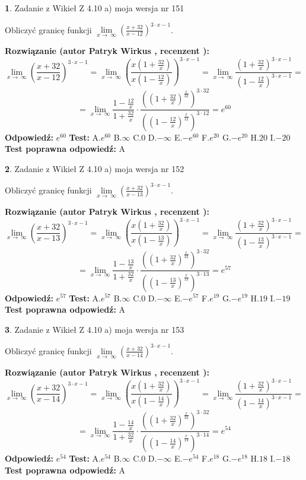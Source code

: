 \documentclass[12pt, a4paper]{article}
\theoremstyle{definition} %
\newtheorem{zad}{}
\newcommand{\zadStart}[1]{\begin{zad}#1\newline}
\newcommand{\zadStop}{\end{zad}}
\newcommand{\rozwStart}[2]{\noindent \textbf{Rozwiązanie (autor #1 , recenzent #2): }\newline}
\newcommand{\rozwStop}{\newline}
\newcommand{\odpStart}{\noindent \textbf{Odpowiedź:}\newline}
\newcommand{\odpStop}{\newline}
\newcommand{\testStart}{\noindent \textbf{Test:}\newline}
\newcommand{\testStop}{\newline}
\newcommand{\kluczStart}{\noindent \textbf{Test poprawna odpowiedź:}\newline}
\newcommand{\kluczStop}{\newline}
\begin{document}
\zadStart{Zadanie z Wikieł Z 4.10 a) moja wersja nr 151}

Obliczyć granicę funkcji  $\lim\limits_{x\to\ \infty}(\frac{x+32}{x-12})^{3\cdot x-1}$.
\zadStop
\rozwStart{Patryk Wirkus}{}
$$\lim\limits_{x\to\ \infty}(\frac{x+32}{x-12})^{3\cdot x-1} = \lim\limits_{x\to\ \infty}(\frac{x(1+\frac{32}{x})}{x(1-\frac{12}{x})})^{3\cdot x-1}=\lim\limits_{x\to\ \infty}\frac{(1+\frac{32}{x})^{3\cdot x-1}}{(1-\frac{12}{x})^{3\cdot x-1}}=$$
$$=\lim\limits_{x\to\ \infty}\frac{1-\frac{12}{x}}{1+\frac{32}{x}}\cdot\frac{((1+\frac{32}{x})^{\frac{x}{32}})^{3\cdot32}}{((1-\frac{12}{x})^{\frac{x}{12}})^{3\cdot12}}=e^{60}$$
\rozwStop
\odpStart
$e^{60}$
\odpStop
\testStart
A.$e^{60}$ B.$\infty$ C.$0$ D.$-\infty$ E.$-e^{60}$
F.$e^{20}$ G.$-e^{20}$
H.$20$
I.$-20$
\testStop
\kluczStart
A
\kluczStop



\zadStart{Zadanie z Wikieł Z 4.10 a) moja wersja nr 152}

Obliczyć granicę funkcji  $\lim\limits_{x\to\ \infty}(\frac{x+32}{x-13})^{3\cdot x-1}$.
\zadStop
\rozwStart{Patryk Wirkus}{}
$$\lim\limits_{x\to\ \infty}(\frac{x+32}{x-13})^{3\cdot x-1} = \lim\limits_{x\to\ \infty}(\frac{x(1+\frac{32}{x})}{x(1-\frac{13}{x})})^{3\cdot x-1}=\lim\limits_{x\to\ \infty}\frac{(1+\frac{32}{x})^{3\cdot x-1}}{(1-\frac{13}{x})^{3\cdot x-1}}=$$
$$=\lim\limits_{x\to\ \infty}\frac{1-\frac{13}{x}}{1+\frac{32}{x}}\cdot\frac{((1+\frac{32}{x})^{\frac{x}{32}})^{3\cdot32}}{((1-\frac{13}{x})^{\frac{x}{13}})^{3\cdot13}}=e^{57}$$
\rozwStop
\odpStart
$e^{57}$
\odpStop
\testStart
A.$e^{57}$ B.$\infty$ C.$0$ D.$-\infty$ E.$-e^{57}$
F.$e^{19}$ G.$-e^{19}$
H.$19$
I.$-19$
\testStop
\kluczStart
A
\kluczStop



\zadStart{Zadanie z Wikieł Z 4.10 a) moja wersja nr 153}

Obliczyć granicę funkcji  $\lim\limits_{x\to\ \infty}(\frac{x+32}{x-14})^{3\cdot x-1}$.
\zadStop
\rozwStart{Patryk Wirkus}{}
$$\lim\limits_{x\to\ \infty}(\frac{x+32}{x-14})^{3\cdot x-1} = \lim\limits_{x\to\ \infty}(\frac{x(1+\frac{32}{x})}{x(1-\frac{14}{x})})^{3\cdot x-1}=\lim\limits_{x\to\ \infty}\frac{(1+\frac{32}{x})^{3\cdot x-1}}{(1-\frac{14}{x})^{3\cdot x-1}}=$$
$$=\lim\limits_{x\to\ \infty}\frac{1-\frac{14}{x}}{1+\frac{32}{x}}\cdot\frac{((1+\frac{32}{x})^{\frac{x}{32}})^{3\cdot32}}{((1-\frac{14}{x})^{\frac{x}{14}})^{3\cdot14}}=e^{54}$$
\rozwStop
\odpStart
$e^{54}$
\odpStop
\testStart
A.$e^{54}$ B.$\infty$ C.$0$ D.$-\infty$ E.$-e^{54}$
F.$e^{18}$ G.$-e^{18}$
H.$18$
I.$-18$
\testStop
\kluczStart
A
\kluczStop
\end{document}
